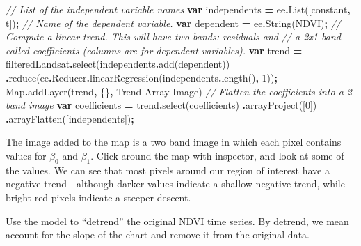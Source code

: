 \documentclass[
]{article}
\newenvironment{Shaded}{\begin{snugshade}}{\end{snugshade}}
\newcommand{\AttributeTok}[1]{\textcolor[rgb]{0.77,0.63,0.00}{#1}}
\newcommand{\BuiltInTok}[1]{#1}
\newcommand{\CommentTok}[1]{\textcolor[rgb]{0.56,0.35,0.01}{\textit{#1}}}
\newcommand{\DecValTok}[1]{\textcolor[rgb]{0.00,0.00,0.81}{#1}}
\newcommand{\FunctionTok}[1]{\textcolor[rgb]{0.00,0.00,0.00}{#1}}
\newcommand{\KeywordTok}[1]{\textcolor[rgb]{0.13,0.29,0.53}{\textbf{#1}}}
\newcommand{\NormalTok}[1]{#1}
\newcommand{\OperatorTok}[1]{\textcolor[rgb]{0.81,0.36,0.00}{\textbf{#1}}}
\newcommand{\StringTok}[1]{\textcolor[rgb]{0.31,0.60,0.02}{#1}}
\begin{document}
\begin{Shaded}
\begin{Highlighting}[]
\CommentTok{// List of the independent variable names}
\KeywordTok{var}\NormalTok{ independents }\OperatorTok{=}\NormalTok{ ee}\OperatorTok{.}\FunctionTok{List}\NormalTok{([}\StringTok{\textquotesingle{}constant\textquotesingle{}}\OperatorTok{,} \StringTok{\textquotesingle{}t\textquotesingle{}}\NormalTok{])}\OperatorTok{;}
\CommentTok{// Name of the dependent variable.}
\KeywordTok{var}\NormalTok{ dependent }\OperatorTok{=}\NormalTok{ ee}\OperatorTok{.}\FunctionTok{String}\NormalTok{(}\StringTok{\textquotesingle{}NDVI\textquotesingle{}}\NormalTok{)}\OperatorTok{;}
\CommentTok{// Compute a linear trend. This will have two bands: \textquotesingle{}residuals\textquotesingle{} and }
\CommentTok{// a 2x1 band called coefficients (columns are for dependent variables).}
\KeywordTok{var}\NormalTok{ trend }\OperatorTok{=}\NormalTok{ filteredLandsat}\OperatorTok{.}\FunctionTok{select}\NormalTok{(independents}\OperatorTok{.}\FunctionTok{add}\NormalTok{(dependent))}
        \OperatorTok{.}\FunctionTok{reduce}\NormalTok{(ee}\OperatorTok{.}\AttributeTok{Reducer}\OperatorTok{.}\FunctionTok{linearRegression}\NormalTok{(independents}\OperatorTok{.}\FunctionTok{length}\NormalTok{()}\OperatorTok{,} \DecValTok{1}\NormalTok{))}\OperatorTok{;}
\BuiltInTok{Map}\OperatorTok{.}\FunctionTok{addLayer}\NormalTok{(trend}\OperatorTok{,}\NormalTok{ \{\}}\OperatorTok{,} \StringTok{\textquotesingle{}Trend Array Image\textquotesingle{}}\NormalTok{)}
\CommentTok{// Flatten the coefficients into a 2{-}band image}
\KeywordTok{var}\NormalTok{ coefficients }\OperatorTok{=}\NormalTok{ trend}\OperatorTok{.}\FunctionTok{select}\NormalTok{(}\StringTok{\textquotesingle{}coefficients\textquotesingle{}}\NormalTok{)}
    \OperatorTok{.}\FunctionTok{arrayProject}\NormalTok{([}\DecValTok{0}\NormalTok{])}
    \OperatorTok{.}\FunctionTok{arrayFlatten}\NormalTok{([independents])}\OperatorTok{;}
\end{Highlighting}
\end{Shaded}

The image added to the map is a two band image in which each pixel contains values for \(\beta_0\) and \(\beta_1\). Click around the map with inspector, and look at some of the values. We can see that most pixels around our region of interest have a negative trend - although darker values indicate a shallow negative trend, while bright red pixels indicate a steeper descent.

Use the model to ``detrend'' the original NDVI time series. By detrend, we mean account for the slope of the chart and remove it from the original data.
\end{document}
